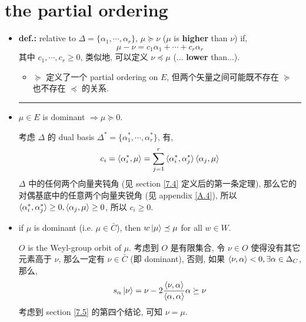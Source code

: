 \section{the partial ordering} \label{7.8}
\begin{itemize}
	\item \textbf{def.:} relative to $\Delta = \{\alpha_1, \cdots, \alpha_r\}$, $\mu \succeq \nu$ ($\mu$ is \textbf{higher} than $\nu$) if,
	\begin{equation}
		\mu - \nu = c_1 \alpha_1 + \cdots + c_r \alpha_r
	\end{equation}
	其中 $c_1, \cdots, c_r \geq 0$, 类似地, 可以定义 $\nu \preceq \mu$ (... \textbf{lower} than...).
	\begin{itemize}
		\item $\succeq$ 定义了一个 partial ordering on $E$, 但两个矢量之间可能既不存在 $\succeq$ 也不存在 $\preceq$ 的关系.
	\end{itemize}
	
	\noindent\rule[0.5ex]{\linewidth}{0.5pt} %
	
	\item $\mu \in E$ is dominant $\Longrightarrow \mu \succeq 0$.
	
	\begin{tcolorbox}[title=proof:]
		考虑 $\Delta$ 的 dual basis $\Delta^* = \{\alpha_1^*, \cdots, \alpha_r^*\}$, 有,
		\begin{equation}
			c_i = \braket{\alpha_i^*, \mu} = \sum_{j = 1}^r \braket{\alpha_i^*, \alpha_j^*} \braket{\alpha_j, \mu}
		\end{equation}
		$\Delta$ 中的任何两个向量夹钝角 (见 section \ref{7.4} 定义后的第一条定理), 那么它的对偶基底中的任意两个向量夹锐角 (见 appendix \ref{A.4}), 所以 $\braket{\alpha_i^*, \alpha_j^*} \geq 0, \braket{\alpha_j, \mu} \geq 0$, 所以 $c_i \geq 0$.
	\end{tcolorbox}
	
	\item if $\mu$ is dominant (i.e. $\mu \in \bar{C}$), then $w \ket{\mu} \preceq \mu$ for all $w \in W$.
	
	\begin{tcolorbox}[title=proof:]
		$O$ is the Weyl-group orbit of $\mu$. 考虑到 $O$ 是有限集合, 令 $\nu \in O$ 使得没有其它元素高于 $\nu$, 那么一定有 $\nu \in \bar{C}$ (即 dominant), 否则, 如果 $\braket{\nu, \alpha} < 0, \exists \alpha \in \Delta_C$, 那么,
		\begin{equation}
			s_\alpha \ket{\nu} = \nu - 2 \frac{\braket{\nu, \alpha}}{\braket{\alpha, \alpha}} \alpha \succeq \nu
		\end{equation}
		考虑到 section \ref{7.5} 的第四个结论, 可知 $\nu = \mu$.
		

\end{tcolorbox}
\end{itemize}
